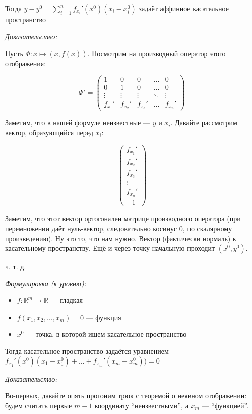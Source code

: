 \documentclass{article}
\begin{document}
Тогда $y - y^0 = \sum_{i = 1}^n{f_{x_i}'(x^0)(x_i - x^0_i)}$ задаёт аффинное касательное пространство

\textit{Доказательство:}

Пусть $\Phi: x \mapsto (x, f(x))$. Посмотрим на производный оператор этого отображения:

\[\Phi' = \begin{pmatrix}
    1 & 0 & 0 & \ldots & 0 \\
    0 & 1 & 0 & \ldots & 0 \\
    \vdots & \vdots & \vdots & \ddots & \vdots \\
    f_{x_1}' & f_{x_2}' & f_{x_3}' & \ldots & f_{x_n}'
\end{pmatrix}\]

Заметим, что в нашей формуле неизвестные --- $y$ и $x_i$. Давайте рассмотрим вектор, образующийся перед $x_i$:

\[\begin{pmatrix}
    f_{x_1}' \\
    f_{x_2}' \\
    f_{x_3}' \\
    \vdots \\
    f_{x_n}' \\
    -1
\end{pmatrix}\]

Заметим, что этот вектор ортогонален матрице производного оператора (при перемножении даёт нуль-вектор, следовательно косинус 0, по скалярному произведению). Ну это то, что нам нужно. Вектор (фактически нормаль) к касательному пространству. Ещё и через точку начальную проходит $(x^0, y^0)$.

ч. т. д.

\textit{Формулировка (к уровню):}

\begin{itemize}
    \item $f: \mathbb{R}^m \rightarrow \mathbb{R}$ --- гладкая
    \item $f(x_1, x_2, \ldots, x_m) = 0$ --- функция
    \item $x^0$ --- точка, в которой ищем касательное пространство
\end{itemize}

Тогда касательное пространство задаётся уравнением $f_{x_1}'(x^0)(x_1 - x^0_1) + \ldots + f_{x_m}'(x_m - x^0_m)) = 0$

\textit{Доказательство:}

Во-первых, давайте опять прогоним трюк с теоремой о неявном отображении: будем считать первые $m - 1$ координату ``неизвестными'', а $x_m$ --- ``функцией''.
\end{document}
